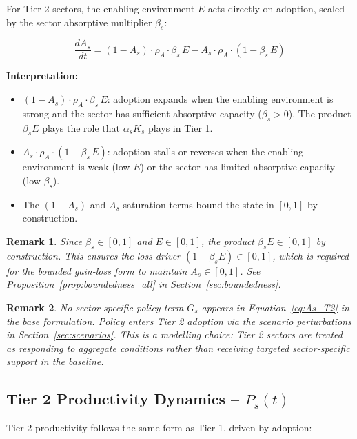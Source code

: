 \documentclass[11pt,a4paper]{article}
\newtheorem{remark}{Remark}
\begin{document}
For Tier 2 sectors, the enabling environment $E$ acts directly on adoption, scaled by the sector absorptive multiplier $\beta_s$:

\begin{equation}
\boxed{
\frac{dA_s}{dt}
= (1 - A_s)\cdot\rho_A\cdot\beta_s\, E
- A_s\cdot\rho_A\cdot(1 - \beta_s\, E)
}
\label{eq:As_T2}
\end{equation}

\textbf{Interpretation:}
\begin{itemize}
  \item $(1 - A_s)\cdot\rho_A\cdot\beta_s\, E$: adoption expands when the enabling environment is strong and the sector has sufficient absorptive capacity ($\beta_s > 0$). The product $\beta_s E$ plays the role that $\alpha_s K_s$ plays in Tier 1.
  \item $A_s\cdot\rho_A\cdot(1 - \beta_s\, E)$: adoption stalls or reverses when the enabling environment is weak (low $E$) or the sector has limited absorptive capacity (low $\beta_s$).
  \item The $(1 - A_s)$ and $A_s$ saturation terms bound the state in $[0,1]$ by construction.
\end{itemize}

\begin{remark}
Since $\beta_s \in [0,1]$ and $E \in [0,1]$, the product $\beta_s E \in [0,1]$ by construction. This ensures the loss driver $(1 - \beta_s E) \in [0,1]$, which is required for the bounded gain-loss form to maintain $A_s \in [0,1]$. See Proposition~\ref{prop:boundedness_all} in Section~\ref{sec:boundedness}.
\end{remark}

\begin{remark}
No sector-specific policy term $G_s$ appears in Equation~\eqref{eq:As_T2} in the base formulation. Policy enters Tier 2 adoption via the scenario perturbations in Section~\ref{sec:scenarios}. This is a modelling choice: Tier 2 sectors are treated as responding to aggregate conditions rather than receiving targeted sector-specific support in the baseline.
\end{remark}

\subsection{Tier 2 Productivity Dynamics -- \texorpdfstring{$P_s(t)$}{Ps(t)}}

Tier 2 productivity follows the same form as Tier 1, driven by adoption:
\end{document}
